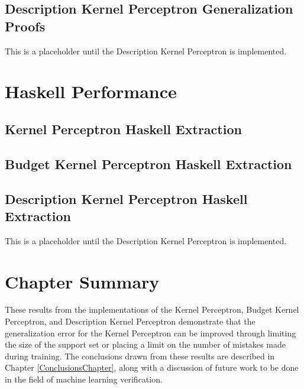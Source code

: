 \subsection{Description Kernel Perceptron Generalization Proofs}\label{KPDProofs}
This is a placeholder until the Description Kernel Perceptron is implemented.
\section{Haskell Performance}\label{HaskellExtraction}
\subsection{Kernel Perceptron Haskell Extraction}\label{KPHaskell}
\subsection{Budget Kernel Perceptron Haskell Extraction}\label{KPBHaskell}
\subsection{Description Kernel Perceptron Haskell Extraction}\label{KPDHaskell}
This is a placeholder until the Description Kernel Perceptron is implemented.
\section{Chapter Summary}\label{ResultsChapterSummarySection}
These results from the implementations of the Kernel Perceptron, Budget Kernel Perceptron, and Description Kernel Perceptron demonstrate that the generalization error for the Kernel Perceptron can be improved through limiting the size of the support set or placing a limit on the number of mistakes made during training. The conclusions drawn from these results are described in Chapter \ref{ConclusionsChapter}, along with a discussion of future work to be done in the field of machine learning verification.
